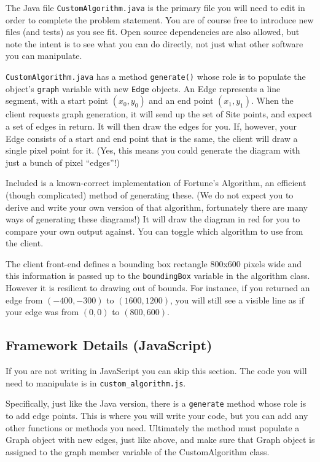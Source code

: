 \documentclass[12pt]{article}
\newcommand{\nl}{\newline}
\begin{document}
The Java file \texttt{CustomAlgorithm.java} is the primary file you will need to edit in
order to complete the problem statement. You are of course free to introduce new
files (and tests) as you see fit. Open source dependencies are also allowed, but
note the intent is to see what you can do directly, not just what other software you
can manipulate.

\texttt{CustomAlgorithm.java} has a method \texttt{generate()} whose role is to
populate the object's \texttt{graph} variable with new \texttt{Edge} objects. An
Edge represents a line segment, with a start point $(x_0, y_0)$ and an end point
$(x_1, y_1)$. When the client requests graph generation, it will send up the set
of Site points, and expect a set of edges in return. It will then draw the edges
for you. If, however, your Edge consists of a start and end point that is the
same, the client will draw a single pixel point for it. (Yes, this means you
could generate the diagram with just a bunch of pixel ``edges''!)

Included is a known-correct implementation of Fortune's Algorithm, an
efficient (though complicated) method of generating these. (We do not expect you
to derive and write your own version of that algorithm, fortunately there are
many ways of generating these diagrams!) It will draw the diagram in red for
you to compare your own output against. You can toggle which algorithm to use
from the client.

The client front-end defines a bounding box rectangle 800x600 pixels wide and
this information is passed up to the \texttt{boundingBox} variable in the
algorithm class. However it is resilient to drawing out of bounds. For instance,
if you returned an edge from $(-400, -300)$ to $(1600,1200)$, you will still see
a visible line as if your edge was from $(0,0)$ to $(800,600)$.

\subsection*{Framework Details (JavaScript)}

If you are not writing in JavaScript you can skip this section.\nl
The code you will need to manipulate is in \texttt{custom\_algorithm.js}.

Specifically, just like the Java version, there is a \texttt{generate} method
whose role is to add edge points. This is where you will write your code, but
you can add any other functions or methods you need. Ultimately the method must
populate a Graph object with new edges, just like above, and make sure that
Graph object is assigned to the graph member variable of the CustomAlgorithm
class.
\end{document}
